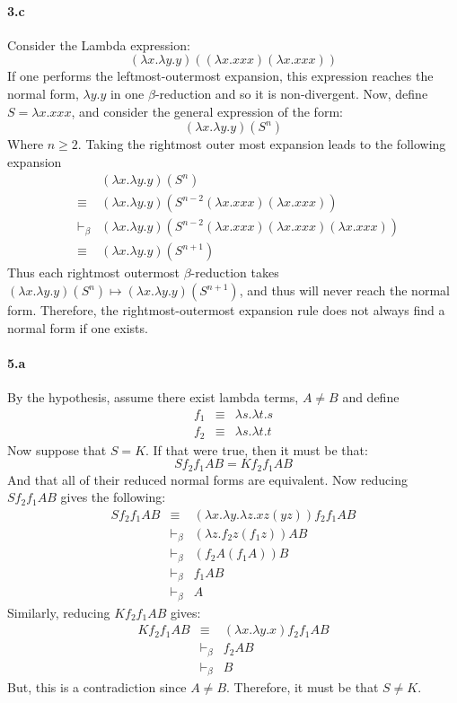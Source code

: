 \documentclass{article}
\begin{document}
\paragraph{3.c}
Consider the Lambda expression:
\[ (\lambda x. \lambda y.y)( (\lambda x.xxx)(\lambda x.xxx) ) \]
If one performs the leftmost-outermost expansion, this expression reaches the normal form, $\lambda y.y$ in one $\beta$-reduction and so it is non-divergent.  Now, define $S = \lambda x.xxx$, and consider the general expression of the form:
\[ (\lambda x. \lambda y.y)( S^n ) \]
Where $n \geq 2$. Taking the rightmost outer most expansion leads to the following expansion
\begin{eqnarray*}
& & ( \lambda x . \lambda y.y)( S^n ) \\
& \equiv & (\lambda x. \lambda y.y)(S^{n-2} (\lambda x.xxx) (\lambda x.xxx) ) \\
& \vdash_\beta & (\lambda x. \lambda y.y)(S^{n-2} (\lambda x.xxx) (\lambda x.xxx) (\lambda x.xxx) ) \\
& \equiv & ( \lambda x . \lambda y.y)( S^{n+1} )
\end{eqnarray*}
Thus each rightmost outermost $\beta$-reduction takes $(\lambda x. \lambda y.y)(S^n) \mapsto (\lambda x. \lambda y.y)(S^{n+1})$, and thus will never reach the normal form.  Therefore, the rightmost-outermost expansion rule does not always find a normal form if one exists.

\paragraph{5.a}
By the hypothesis, assume there exist lambda terms, $A \neq B$ and define 
\begin{eqnarray*}
f_1 & \equiv & \lambda s. \lambda t. s \\
f_2 & \equiv & \lambda s. \lambda t. t
\end{eqnarray*}
Now suppose that $S = K$.  If that were true, then it must be that:
\[ S f_2 f_1 A B = K f_2 f_1 A B \]
And that all of their reduced normal forms are equivalent.  Now reducing $S f_2 f_1 A B$ gives the following:
\begin{eqnarray*}
S f_2 f_1 A B & \equiv & (\lambda x . \lambda y . \lambda z . x z (y z) ) f_2 f_1 A B \\
& \vdash_\beta & (\lambda z . f_2 z (f_1 z)) A B \\
& \vdash_\beta & (f_2 A (f_1 A)) B \\
& \vdash_\beta & f_1 A B \\
& \vdash_\beta & A
\end{eqnarray*}
Similarly, reducing $K f_2 f_1 A B$ gives:
\begin{eqnarray*}
K f_2 f_1 A B & \equiv & ( \lambda x . \lambda y . x ) f_2 f_1 A B \\
& \vdash_\beta & f_2 A B \\
& \vdash_\beta & B
\end{eqnarray*}
But, this is a contradiction since $A \neq B$.  Therefore, it must be that $S \neq K$.
\end{document}
